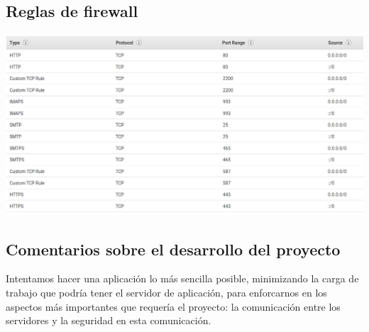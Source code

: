 \documentclass[9pt]{article}
\begin{document}
\subsection{Reglas de firewall}
\begin{center}
\includegraphics[scale=0.3]{mail/03} \\
\end{center}

\newpage

\subsection*{Comentarios sobre el desarrollo del proyecto}
Intentamos hacer una aplicación lo más sencilla posible, minimizando la carga de trabajo que podría tener el servidor de aplicación, para enforcarnos en los aspectos más importantes que requería el proyecto: la comunicación entre los servidores y la seguridad en esta comunicación. %
\end{document}
